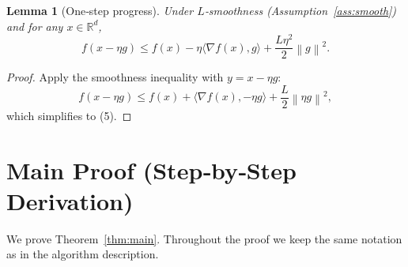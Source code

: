 \documentclass{article}
\newtheorem{lemma}{Lemma}
\newcommand{\norm}[1]{\left\lVert #1\right\rVert}
\begin{document}
\begin{lemma}[One‑step progress]\label{lem:onestep}
Under $L$‑smoothness (Assumption~\ref{ass:smooth}) and for any $x\in\mathbb{R}^d$,
\[
f(x-\eta g)\le f(x)-\eta\langle\nabla f(x),g\rangle+\frac{L\eta^2}{2}\norm{g}^2 .
\tag{5}
\]
\end{lemma}
\begin{proof}
Apply the smoothness inequality with $y=x-\eta g$:
\[
f(x-\eta g)\le f(x)+\langle\nabla f(x),-\eta g\rangle+\frac{L}{2}\norm{\eta g}^2,
\]
which simplifies to (5). \hfill\qedsymbol
\end{proof}

\section*{Main Proof (Step‑by‑Step Derivation)}
We prove Theorem~\ref{thm:main}. Throughout the proof we keep the same notation as in the algorithm description.
\end{document}
